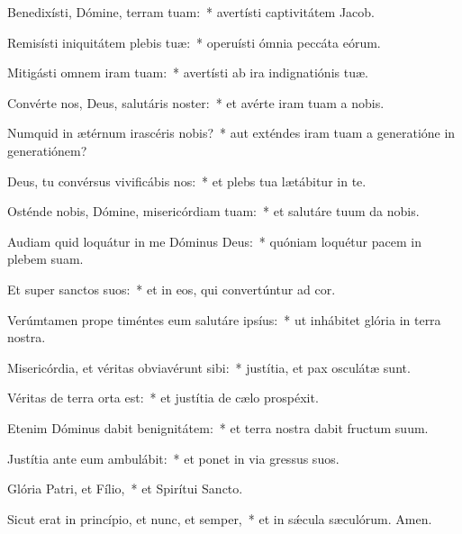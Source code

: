 \item Benedixísti, Dómine, terram tuam:~* avertísti captivitátem Jacob.

\item Remisísti iniquitátem plebis tuæ:~* operuísti ómnia peccáta eórum.

\item Mitigásti omnem iram tuam:~* avertísti ab ira indignatiónis tuæ.

\item Convérte nos, Deus, salutáris noster:~* et avérte iram tuam a nobis.

\item Numquid in ætérnum irascéris nobis?~* aut exténdes iram tuam a generatióne in generatiónem?

\item Deus, tu convérsus vivificábis nos:~* et plebs tua lætábitur in te.

\item Osténde nobis, Dómine, misericórdiam tuam:~* et salutáre tuum da nobis.

\item Audiam quid loquátur in me Dóminus Deus:~* quóniam loquétur pacem in plebem suam.

\item Et super sanctos suos:~* et in eos, qui convertúntur ad cor.

\item Verúmtamen prope timéntes eum salutáre ipsíus:~* ut inhábitet glória in terra nostra.

\item Misericórdia, et véritas obviavérunt sibi:~* justítia, et pax osculátæ sunt.

\item Véritas de terra orta est:~* et justítia de cælo prospéxit.

\item Etenim Dóminus dabit benignitátem:~* et terra nostra dabit fructum suum.

\item Justítia ante eum ambulábit:~* et ponet in via gressus suos.

\item Glória Patri, et Fílio,~* et Spirítui Sancto.

\item Sicut erat in princípio, et nunc, et semper,~* et in sǽcula sæculórum. Amen.

